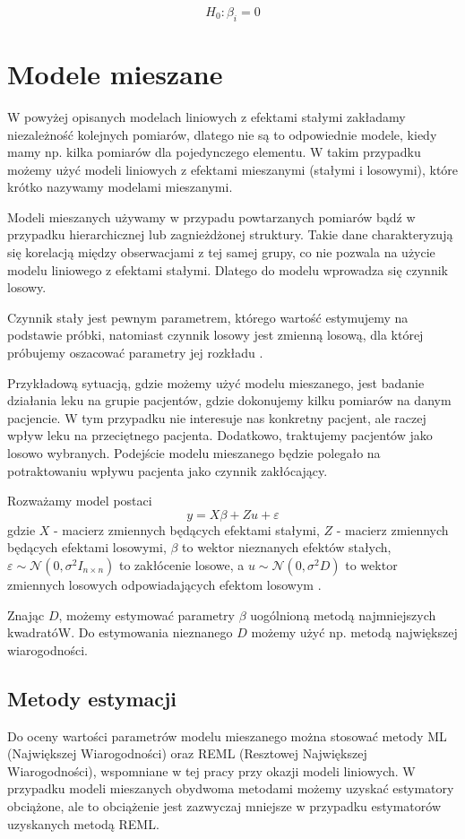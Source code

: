 \documentclass[12pt]{mwbk}
\theoremstyle{plain}
\theoremstyle{definition}
\theoremstyle{remark}
\begin{document}
$$H_0: \beta_i = 0$$

\section{Modele mieszane} 
W powyżej opisanych modelach liniowych z efektami stałymi zakładamy niezależność kolejnych pomiarów, dlatego nie są to odpowiednie modele, kiedy mamy np. kilka pomiarów dla pojedynczego elementu. W takim przypadku możemy użyć modeli liniowych z efektami mieszanymi (stałymi i losowymi), które krótko nazywamy modelami mieszanymi.

Modeli mieszanych używamy w przypadu powtarzanych pomiarów bądź w przypadku hierarchicznej lub zagnieżdżonej struktury. Takie dane charakteryzują się korelacją między obserwacjami z tej samej grupy, co nie pozwala na użycie modelu liniowego z efektami stałymi. Dlatego do modelu wprowadza się czynnik losowy. 

Czynnik stały jest pewnym parametrem, którego wartość estymujemy na podstawie próbki, natomiast czynnik losowy jest zmienną losową, dla której próbujemy oszacować parametry jej rozkładu \cite{faraway}.
	
Przykładową sytuacją, gdzie możemy użyć modelu mieszanego, jest badanie działania leku na grupie pacjentów, gdzie dokonujemy kilku pomiarów na danym pacjencie. W tym przypadku nie interesuje nas konkretny pacjent, ale raczej wpływ leku na przeciętnego pacjenta. Dodatkowo, traktujemy pacjentów jako losowo wybranych. Podejście modelu mieszanego będzie polegało na potraktowaniu wpływu pacjenta jako czynnik zakłócający. 

Rozważamy model postaci
$$y=X\beta +Z u + \varepsilon$$
gdzie $X$ - macierz zmiennych będących efektami stałymi, $Z$ - macierz zmiennych będących efektami losowymi, $\beta$ to wektor nieznanych efektów stałych, $\varepsilon \sim \mathcal{N}(0, \sigma^2 I_{n\times n})$ to zakłócenie losowe, a $u \sim \mathcal{N} (0, \sigma^2D)$ to wektor zmiennych losowych odpowiadających efektom losowym \cite{biecek}.

Znając $D$, możemy estymować parametry $\beta$ uogólnioną metodą najmniejszych kwadratóW. Do estymowania nieznanego $D$ możemy użyć np. metodą największej wiarogodności.

\subsection{Metody estymacji}

Do oceny wartości parametrów modelu mieszanego można stosować metody ML (Największej Wiarogodności) oraz REML (Resztowej Największej Wiarogodności), wspomniane w tej pracy przy okazji modeli liniowych. W przypadku modeli mieszanych obydwoma metodami możemy uzyskać estymatory obciążone, ale to obciążenie jest zazwyczaj mniejsze w przypadku estymatorów uzyskanych metodą REML.
\end{document}
